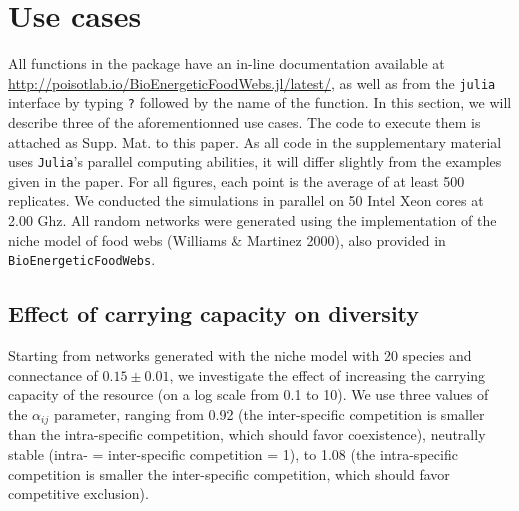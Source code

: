 \documentclass[12pt]{article}
\begin{document}
\section{Use cases}\label{use-cases}

All functions in the package have an in-line documentation available at
\url{http://poisotlab.io/BioEnergeticFoodWebs.jl/latest/}, as well as
from the \texttt{julia} interface by typing \texttt{?} followed by the
name of the function. In this section, we will describe three of the
aforementionned use cases. The code to execute them is attached as Supp.
Mat. to this paper. As all code in the supplementary material uses
\texttt{Julia}'s parallel computing abilities, it will differ slightly
from the examples given in the paper. For all figures, each point is the
average of at least 500 replicates. We conducted the simulations in
parallel on 50 Intel Xeon cores at 2.00 Ghz. All random networks were
generated using the implementation of the niche model of food webs
(Williams \& Martinez 2000), also provided in
\texttt{BioEnergeticFoodWebs}.

\subsection{Effect of carrying capacity on
diversity}\label{effect-of-carrying-capacity-on-diversity}

Starting from networks generated with the niche model with 20 species
and connectance of \(0.15 \pm 0.01\), we investigate the effect of
increasing the carrying capacity of the resource (on a log scale from
0.1 to 10). We use three values of the \(\alpha_{ij}\) parameter,
ranging from 0.92 (the inter-specific competition is smaller than the
intra-specific competition, which should favor coexistence), neutrally
stable (intra- = inter-specific competition = 1), to 1.08 (the
intra-specific competition is smaller the inter-specific competition,
which should favor competitive exclusion).
\end{document}
